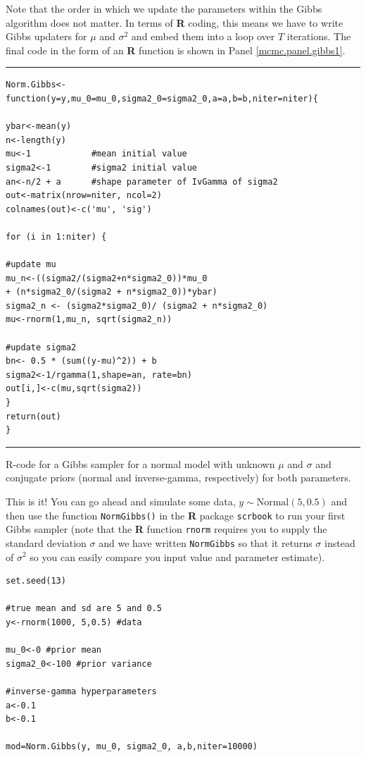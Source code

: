 Note that the order in which we update the parameters within the Gibbs algorithm does not matter. In terms of {\bf R} coding, this means we have to write Gibbs updaters for
$\mu$ and $\sigma^2$ and embed them into a loop over $T$ iterations. The final
code in the form of an {\bf R} function is shown
in Panel \ref{mcmc.panel.gibbs1}.
\begin{panel}[htp]
\centering
\rule[0.15in]{\textwidth}{.03in}
{\small
\begin{verbatim}
Norm.Gibbs<-function(y=y,mu_0=mu_0,sigma2_0=sigma2_0,a=a,b=b,niter=niter){

ybar<-mean(y)
n<-length(y)
mu<-1            #mean initial value
sigma2<-1        #sigma2 initial value
an<-n/2 + a      #shape parameter of IvGamma of sigma2
out<-matrix(nrow=niter, ncol=2)
colnames(out)<-c('mu', 'sig')

for (i in 1:niter) {

#update mu 
mu_n<-((sigma2/(sigma2+n*sigma2_0))*mu_0
+ (n*sigma2_0/(sigma2 + n*sigma2_0))*ybar)
sigma2_n <- (sigma2*sigma2_0)/ (sigma2 + n*sigma2_0)
mu<-rnorm(1,mu_n, sqrt(sigma2_n))

#update sigma2 
bn<- 0.5 * (sum((y-mu)^2)) + b
sigma2<-1/rgamma(1,shape=an, rate=bn)
out[i,]<-c(mu,sqrt(sigma2))
}
return(out)
}
\end{verbatim}
}
\rule[-0.15in]{\textwidth}{.03in}
\caption{
R-code for a Gibbs sampler for a normal model with unknown $\mu$
and $\sigma$ and conjugate priors (normal and inverse-gamma, respectively)
for both parameters.
}
\label{mcmc.panel.gibbs1}
\end{panel}

This is it! You can go ahead and simulate some data, $y \sim \mbox{Normal}(5, 0.5)$ and then use the function \mbox{\tt NormGibbs()} in the {\bf R} package \mbox{\tt scrbook} to run your first Gibbs sampler (note that the {\bf R} function {\tt rnorm} requires you to supply the standard deviation $\sigma$ and we have written {\tt NormGibbs} so that it returns $\sigma$ instead of $\sigma^2$ so you can easily compare you input value and parameter estimate).

\begin{verbatim}
set.seed(13)

#true mean and sd are 5 and 0.5
y<-rnorm(1000, 5,0.5) #data

mu_0<-0 #prior mean
sigma2_0<-100 #prior variance

#inverse-gamma hyperparameters
a<-0.1
b<-0.1

mod=Norm.Gibbs(y, mu_0, sigma2_0, a,b,niter=10000)
\end{verbatim}

